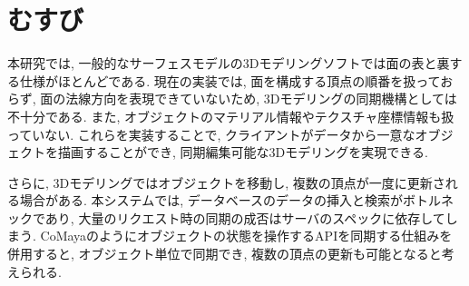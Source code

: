 \chapter{むすび} \label{chap:conclusion}
本研究では, 
一般的なサーフェスモデルの3Dモデリングソフトでは面の表と裏する仕様がほとんどである.
現在の実装では, 面を構成する頂点の順番を扱っておらず, 面の法線方向を表現できていないため, 3Dモデリングの同期機構としては不十分である. また, オブジェクトのマテリアル情報やテクスチャ座標情報も扱っていない.
これらを実装することで, クライアントがデータから一意なオブジェクトを描画することができ, 同期編集可能な3Dモデリングを実現できる.

さらに, 3Dモデリングではオブジェクトを移動し, 複数の頂点が一度に更新される場合がある. 本システムでは, データベースのデータの挿入と検索がボトルネックであり, 大量のリクエスト時の同期の成否はサーバのスペックに依存してしまう. CoMayaのようにオブジェクトの状態を操作するAPIを同期する仕組みを併用すると, オブジェクト単位で同期でき, 複数の頂点の更新も可能となると考えられる.
